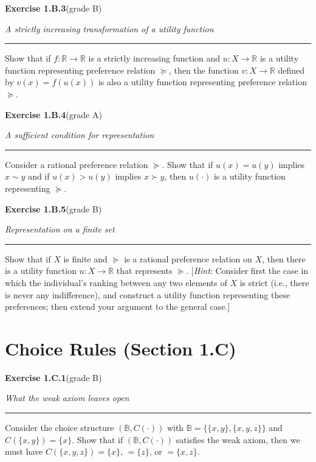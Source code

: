 \documentclass[12pt]{article}
\newcommand{\exercise}[3]{%
  \par\penalty-250\bigskip
  \noindent\textbf{\large Exercise #1}\quad\textnormal{(grade #2)}%
  \par\nobreak\smallskip
  \noindent\textit{#3}%
  \par\nobreak\smallskip
  \noindent\rule{\linewidth}{0.4pt}%
  \par\nobreak\smallskip}
\newenvironment{statement}{\par\medskip}{\par\medskip}
\begin{document}
\exercise{1.B.3}{B}{A strictly increasing transformation of a utility function}

\begin{statement}
Show that if $f:\mathbb R\to\mathbb R$ is a strictly increasing function and
$u:X\to\mathbb R$ is a utility function representing preference relation
$\succeq$, then the function $v:X\to\mathbb R$ defined by $v(x)=f(u(x))$ is
also a utility function representing preference relation $\succeq$.
\end{statement}


\exercise{1.B.4}{A}{A sufficient condition for representation}

\begin{statement}
Consider a rational preference relation $\succeq$. Show that if $u(x)=u(y)$
implies $x\sim y$ and if $u(x)>u(y)$ implies $x\succ y$, then $u(\cdot)$ is a
utility function representing $\succeq$.
\end{statement}


\exercise{1.B.5}{B}{Representation on a finite set}

\begin{statement}
Show that if $X$ is finite and $\succeq$ is a rational preference relation on
$X$, then there is a utility function $u:X\to\mathbb R$ that represents
$\succeq$. [\emph{Hint}: Consider first the case in which the individual's
ranking between any two elements of $X$ is strict (i.e., there is never any
indifference), and construct a utility function representing these preferences;
then extend your argument to the general case.]
\end{statement}


\newpage
\section*{Choice Rules (Section 1.C)}

\exercise{1.C.1}{B}{What the weak axiom leaves open}

\begin{statement}
Consider the choice structure $(\mathbb B,C(\cdot))$ with
$\mathbb B=\bigl\{\{x,y\},\{x,y,z\}\bigr\}$ and $C(\{x,y\})=\{x\}$. Show that
if $(\mathbb B,C(\cdot))$ satisfies the weak axiom, then we must have
$C(\{x,y,z\})=\{x\}$, $=\{z\}$, or $=\{x,z\}$.
\end{statement}
\end{document}
